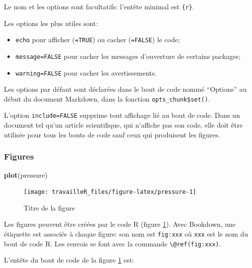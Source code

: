 \documentclass[
  12pt,
  french,
  a4paper,
  extrafontsizes,onecolumn,openright
  ]{memoir}
\newenvironment{Shaded}{\begin{snugshade}}{\end{snugshade}}
\newcommand{\FunctionTok}[1]{\textcolor[rgb]{0.13,0.29,0.53}{\textbf{#1}}}
\newcommand{\NormalTok}[1]{#1}
\providecommand{\tightlist}{%
  \setlength{\itemsep}{0pt}\setlength{\parskip}{0pt}}
\begin{document}
Le nom et les options sont facultatifs: l'entête minimal est \texttt{\{r\}}.

Les options les plus utiles sont:

\begin{itemize}
\tightlist
\item
  \texttt{echo} pour afficher (\texttt{=TRUE}) ou cacher (\texttt{=FALSE}) le code;
\item
  \texttt{message=FALSE} pour cacher les messages d'ouverture de certains packages;
\item
  \texttt{warning=FALSE} pour cacher les avertissements.
\end{itemize}

Les options par défaut sont déclarées dans le bout de code nommé \enquote{Options} au début du document Markdown, dans la fonction \texttt{opts\_chunk\$set()}.

L'option \texttt{include=FALSE} supprime tout affichage lié au bout de code.
Dans un document tel qu'un article scientifique, qui n'affiche pas son code, elle doit être utilisée pour tous les bouts de code sauf ceux qui produisent les figures.

\subsubsection{Figures}\label{figures}

\scriptsize

\begin{Shaded}
\begin{Highlighting}[]
\FunctionTok{plot}\NormalTok{(pressure)}
\end{Highlighting}
\end{Shaded}

\begin{figure}

{\centering \texttt{[image: travailleR\_files/figure-latex/pressure-1]} 

}

\caption{Titre de la figure}\label{fig:pressure}
\end{figure}

\normalsize

Les figures peuvent être créées par le code R (figure \ref{fig:pressure}).
Avec Bookdown, une étiquette est associée à chaque figure: son nom est \texttt{fig:xxx} où \texttt{xxx} est le nom du bout de code R.
Les renvois se font avec la commande \texttt{\textbackslash{}@ref(fig:xxx)}.

L'entête du bout de code de la figure \ref{fig:pressure} est:
\end{document}

